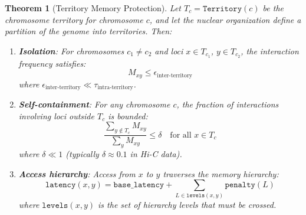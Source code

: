 \documentclass[12pt,a4paper]{article}
\theoremstyle{plain}
\newtheorem{theorem}{Theorem}[section]
\theoremstyle{definition}
\begin{document}
\begin{theorem}[Territory Memory Protection]\label{thm:territory}
Let $T_c = \texttt{Territory}(c)$ be the chromosome territory for chromosome $c$, and let the nuclear organization define a partition of the genome into territories. Then:
\begin{enumerate}[label=(\alph*)]
  \item \textbf{Isolation}: For chromosomes $c_1 \neq c_2$ and loci $x \in T_{c_1}$, $y \in T_{c_2}$, the interaction frequency satisfies:
  \[
    M_{xy} \leq \epsilon_{\text{inter-territory}}
  \]
  where $\epsilon_{\text{inter-territory}} \ll \tau_{\text{intra-territory}}$.
  \item \textbf{Self-containment}: For any chromosome $c$, the fraction of interactions involving loci outside $T_c$ is bounded:
  \[
    \frac{\sum_{y \notin T_c} M_{xy}}{\sum_{y} M_{xy}} \leq \delta \quad \text{for all } x \in T_c
  \]
  where $\delta \ll 1$ (typically $\delta \approx 0.1$ in Hi-C data).
  \item \textbf{Access hierarchy}: Access from $x$ to $y$ traverses the memory hierarchy:
  \[
    \texttt{latency}(x, y) = \texttt{base\_latency} + \sum_{L \in \texttt{levels}(x,y)} \texttt{penalty}(L)
  \]
  where $\texttt{levels}(x,y)$ is the set of hierarchy levels that must be crossed.
\end{enumerate}
\end{theorem}
\end{document}
